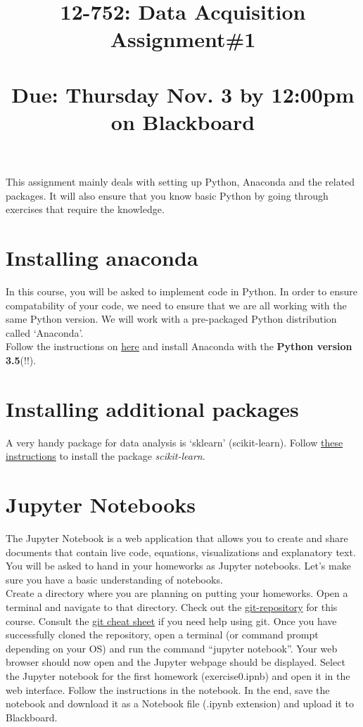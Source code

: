 \documentclass[times, 12pt, singlecolumn]{article}
\title{12-752: Data Acquisition\\ Assignment\#1\\\quad \\Due: Thursday Nov. 3 by 12:00pm on Blackboard}
\begin{document}
\maketitle

This assignment mainly deals with setting up Python, Anaconda and the related packages. It will also ensure that you know basic Python by going through exercises that require the knowledge.

\section{Installing anaconda}

In this course, you will be asked to implement code in Python. In order to ensure compatability of your code, we need to ensure that we are all working with the same Python version. We will work with a pre-packaged Python distribution called `Anaconda'.\\

Follow the instructions on \textcolor{blue}{\href{https://www.continuum.io/downloads}{here}} and install Anaconda with the \textbf{Python version 3.5}(!!).


\section{Installing additional packages}
A very handy package for data analysis is `sklearn' (scikit-learn). Follow  \textcolor{blue}{\href{http://conda.pydata.org/docs/test-drive.html\#managing-packages}{these instructions}} to install the package \emph{scikit-learn}.

\newpage
\section{Jupyter Notebooks}
The Jupyter Notebook is a web application that allows you to create and share documents that contain live code, equations, visualizations and explanatory text. You will be asked to hand in your homeworks as Jupyter notebooks. Let's make sure you have a basic understanding of notebooks. \\

Create a directory where you are planning on putting your homeworks. Open a terminal and navigate to that directory. Check out the  \textcolor{blue}{\href{https://github.com/marioberges/F16-12-752}{git-repository}} for this course. Consult the  \textcolor{blue}{\href{https://services.github.com/kit/downloads/github-git-cheat-sheet.pdf}{git cheat sheet}} if you need help using git. Once you have successfully cloned the repository, open a terminal (or command prompt depending on your OS) and run the command ``jupyter notebook''. Your web browser should now open and the Jupyter webpage should be displayed. Select the Jupyter notebook for the first homework (exercise0.ipnb) and open it in the web interface. Follow the instructions in the notebook. In the end, save the notebook and download it as a Notebook file (.ipynb extension) and upload it to Blackboard.
\end{document}
